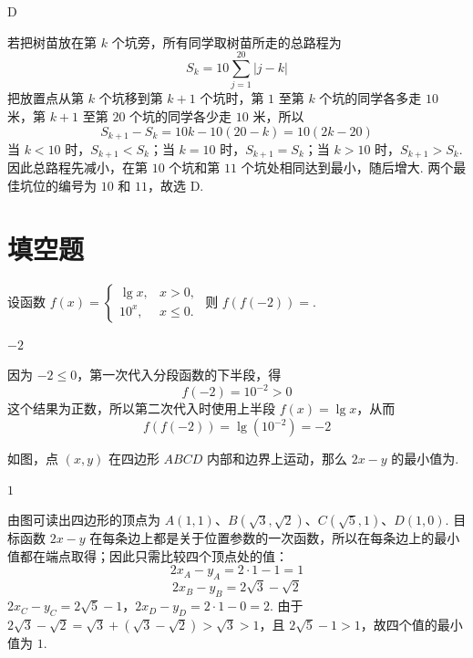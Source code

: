 \begin{answer}
D
\end{answer}

\begin{solution}
若把树苗放在第 \(k\) 个坑旁，所有同学取树苗所走的总路程为
\[
S_k=10\sum_{j=1}^{20}|j-k|
\]
把放置点从第 \(k\) 个坑移到第 \(k+1\) 个坑时，第 \(1\) 至第 \(k\) 个坑的同学各多走 \(10\) 米，第 \(k+1\) 至第 \(20\) 个坑的同学各少走 \(10\) 米，所以
\[
S_{k+1}-S_k=10k-10(20-k)=10(2k-20)
\]
当 \(k<10\) 时，\(S_{k+1}<S_k\)；当 \(k=10\) 时，\(S_{k+1}=S_k\)；当 \(k>10\) 时，\(S_{k+1}>S_k\). 因此总路程先减小，在第 \(10\) 个坑和第 \(11\) 个坑处相同达到最小，随后增大. 两个最佳坑位的编号为 \(10\) 和 \(11\)，故选 D.
\end{solution}

\section{填空题}

\begin{problem}
设函数 \( f(x) = \begin{cases}
\lg x, & x > 0,\\
10^x, & x \leqslant 0.
\end{cases} \) 则 \( f(f(-2)) = \)\fillinblank{}.
\end{problem}

\begin{answer}
\(-2\)
\end{answer}

\begin{solution}
因为 \(-2\leqslant0\)，第一次代入分段函数的下半段，得
\[
f(-2)=10^{-2}>0
\]
这个结果为正数，所以第二次代入时使用上半段 \(f(x)=\lg x\)，从而
\[
f(f(-2))=\lg(10^{-2})=-2
\]
\end{solution}

\begin{problem}
如图，点 \((x, y)\) 在四边形 \(ABCD\) 内部和边界上运动，那么 \(2x - y\) 的最小值为\fillinblank{}.

\end{problem}

\begin{answer}
\(1\)
\end{answer}

\begin{solution}
由图可读出四边形的顶点为 \(A(1,1)\)、\(B(\sqrt3,\sqrt2)\)、\(C(\sqrt5,1)\)、\(D(1,0)\). 目标函数 \(2x-y\) 在每条边上都是关于位置参数的一次函数，所以在每条边上的最小值都在端点取得；因此只需比较四个顶点处的值：
\[
2x_A-y_A=2\cdot1-1=1
\]
\[
2x_B-y_B=2\sqrt3-\sqrt2
\]
\(2x_C-y_C=2\sqrt5-1\)，\(2x_D-y_D=2\cdot1-0=2\). 由于 \(2\sqrt3-\sqrt2=\sqrt3+(\sqrt3-\sqrt2)>\sqrt3>1\)，且 \(2\sqrt5-1>1\)，故四个值的最小值为 \(1\).
\end{solution}

